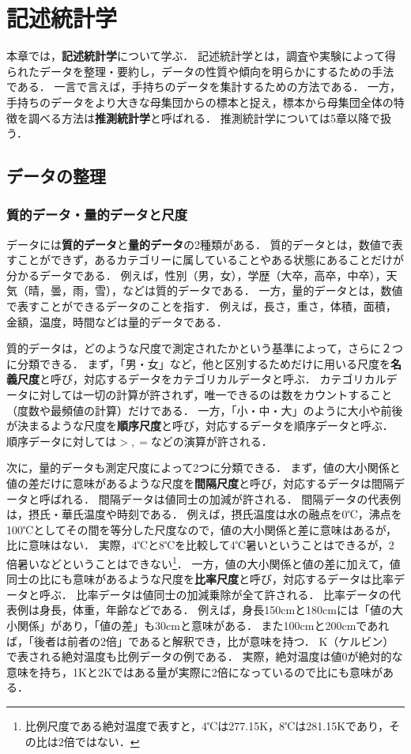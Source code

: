 \chapter{記述統計学}
%
本章では，\textbf{記述統計学}について学ぶ．
%
記述統計学とは，調査や実験によって得られたデータを整理・要約し，データの性質や傾向を明らかにするための手法である．
%
一言で言えば，手持ちのデータを集計するための方法である．
%
一方，手持ちのデータをより大きな母集団からの標本と捉え，標本から母集団全体の特徴を調べる方法は\textbf{推測統計学}と呼ばれる．
%
推測統計学については5章以降で扱う．
%

\section{データの整理}

\subsection{質的データ・量的データと尺度}
%
データには\textbf{質的データ}と\textbf{量的データ}の2種類がある．
%
質的データとは，数値で表すことができず，あるカテゴリーに属していることやある状態にあることだけが分かるデータである．
%
例えば，性別（男，女），学歴（大卒，高卒，中卒），天気（晴，曇，雨，雪），などは質的データである．
%
一方，量的データとは，数値で表すことができるデータのことを指す．
%
例えば，長さ，重さ，体積，面積，金額，温度，時間などは量的データである．
%

%
質的データは，どのような尺度で測定されたかという基準によって，さらに２つに分類できる．
%
まず，「男・女」など，他と区別するためだけに用いる尺度を\textbf{名義尺度}と呼び，対応するデータをカテゴリカルデータと呼ぶ．
%
カテゴリカルデータに対しては一切の計算が許されず，唯一できるのは数をカウントすること（度数や最頻値の計算）だけである．
%
一方，「小・中・大」のように大小や前後が決まるような尺度を\textbf{順序尺度}と呼び，対応するデータを順序データと呼ぶ．
%
順序データに対しては$ >, = $などの演算が許される．
%

%
次に，量的データも測定尺度によって2つに分類できる．
%
まず，値の大小関係と値の差だけに意味があるような尺度を\textbf{間隔尺度}と呼び，対応するデータは間隔データと呼ばれる．
%
間隔データは値同士の加減が許される．
%
間隔データの代表例は，摂氏・華氏温度や時刻である．
%
例えば，摂氏温度は水の融点を0℃，沸点を100℃としてその間を等分した尺度なので，値の大小関係と差に意味はあるが，比に意味はない．
%
実際，4℃と8℃を比較して4℃暑いということはできるが，2倍暑いなどということはできない\footnote{比例尺度である絶対温度で表すと，4℃は277.15K，8℃は281.15Kであり，その比は2倍ではない\cite{d}．}．
%
一方，値の大小関係と値の差に加えて，値同士の比にも意味があるような尺度を\textbf{比率尺度}と呼び，対応するデータは比率データと呼ぶ．
%
比率データは値同士の加減乗除が全て許される．
%
比率データの代表例は身長，体重，年齢などである．
%
例えば，身長150cmと180cmには「値の大小関係」があり，「値の差」も30cmと意味がある．
%
また100cmと200cmであれば，「後者は前者の2倍」であると解釈でき，比が意味を持つ．
%
K（ケルビン）で表される絶対温度も比例データの例である．
%
実際，絶対温度は値0が絶対的な意味を持ち，1Kと2Kではある量が実際に2倍になっているので比にも意味がある．
%

